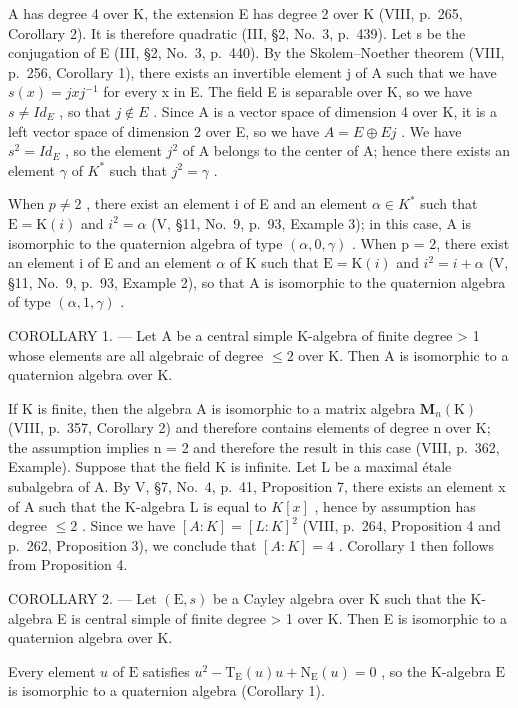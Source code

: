 A has degree 4 over K, the extension E has degree 2 over K (VIII, p.~265, Corollary 2). It is therefore quadratic (III, §2, No.~3, p.~439). Let s be the conjugation of E (III, §2, No.~3, p.~440). By the Skolem--Noether theorem (VIII, p.~256, Corollary 1), there exists an invertible element j of A such that we have \(s(x) = jxj^{-1}\) for every x in E. The field E is separable over K, so we have \(s \neq Id_{E}\) , so that \(j \notin E\) . Since A is a vector space of dimension 4 over K, it is a left vector space of dimension 2 over E, so we have \(A = E \oplus Ej\) . We have \(s^{2} = Id_{E}\) , so the element \(j^{2}\) of A belongs to the center of A; hence there exists an element \(\gamma\) of \(K^{*}\) such that \(j^{2} = \gamma\) .

When \(p \neq 2\) , there exist an element i of E and an element \(\alpha \in K^{*}\) such that \(\mathrm{E} = \mathrm{K}(i)\) and \(i^{2} = \alpha\) (V, §11, No.~9, p.~93, Example 3); in this case, A is isomorphic to the quaternion algebra of type \((\alpha, 0, \gamma)\) . When p = 2, there exist an element i of E and an element \(\alpha\) of K such that \(\mathrm{E} = \mathrm{K}(i)\) and \(i^{2} = i + \alpha\) (V, §11, No.~9, p.~93, Example 2), so that A is isomorphic to the quaternion algebra of type \((\alpha, 1, \gamma)\) .

COROLLARY 1. --- Let A be a central simple K-algebra of finite degree \textgreater{} 1 whose elements are all algebraic of degree \(\leqslant 2\) over K. Then A is isomorphic to a quaternion algebra over K.

If K is finite, then the algebra A is isomorphic to a matrix algebra \(\mathbf{M}_{n}(\mathrm{K})\) (VIII, p.~357, Corollary 2) and therefore contains elements of degree n over K; the assumption implies n = 2 and therefore the result in this case (VIII, p.~362, Example). Suppose that the field K is infinite. Let L be a maximal étale subalgebra of A. By V, §7, No.~4, p.~41, Proposition 7, there exists an element x of A such that the K-algebra L is equal to \(K[x]\) , hence by assumption has degree \(\leqslant 2\) . Since we have \([A : K] = [L : K]^{2}\) (VIII, p.~264, Proposition 4 and p.~262, Proposition 3), we conclude that \([A : K] = 4\) . Corollary 1 then follows from Proposition 4.

COROLLARY 2. --- Let \((\mathrm{E}, s)\) be a Cayley algebra over K such that the K-algebra E is central simple of finite degree \textgreater{} 1 over K. Then E is isomorphic to a quaternion algebra over K.

Every element \(u\) of \(\mathrm{E}\) satisfies \(u^2 - \mathrm{T}_{\mathrm{E}}(u)u + \mathrm{N}_{\mathrm{E}}(u) = 0\) , so the K-algebra \(\mathrm{E}\) is isomorphic to a quaternion algebra (Corollary 1).

